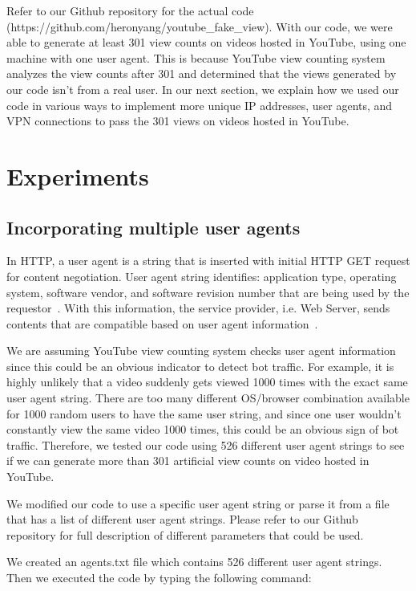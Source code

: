\documentclass[conference]{IEEEtran}
\begin{document}
Refer to our Github repository for the actual code (https://github.com/heronyang/youtube\_fake\_view). With our code, we were able to generate at least 301 view counts on videos hosted in YouTube, using one machine with one user agent. This is because YouTube view counting system analyzes the view counts after 301 and determined that the views generated by our code isn’t from a real user. In our next section, we explain how we used our code in various ways to implement more unique IP addresses, user agents, and VPN connections to pass the 301 views on videos hosted in YouTube.

\section{Experiments}

\subsection{Incorporating multiple user agents}

In HTTP, a user agent is a string that is inserted with initial HTTP GET request for content negotiation. User agent string identifies: application type, operating system, software vendor, and software revision number that are being used by the requestor~\cite{c16}. With this information, the service provider, i.e. Web Server, sends contents that are compatible based on user agent information~\cite{c16}.

We are assuming YouTube view counting system checks user agent information since this could be an obvious indicator to detect bot traffic. For example, it is highly unlikely that a video suddenly gets viewed 1000 times with the exact same user agent string. There are too many different OS/browser combination available for 1000 random users to have the same user string, and since one user wouldn’t constantly view the same video 1000 times, this could be an obvious sign of bot traffic. Therefore, we tested our code using 526 different user agent strings to see if we can generate more than 301 artificial view counts on video hosted in YouTube.

We modified our code to use a specific user agent string or parse it from a file that has a list of different user agent strings. Please refer to our Github repository for full description of different parameters that could be used.

We created an agents.txt file which contains 526 different user agent strings. Then we executed the code by typing the following command:
\end{document}

